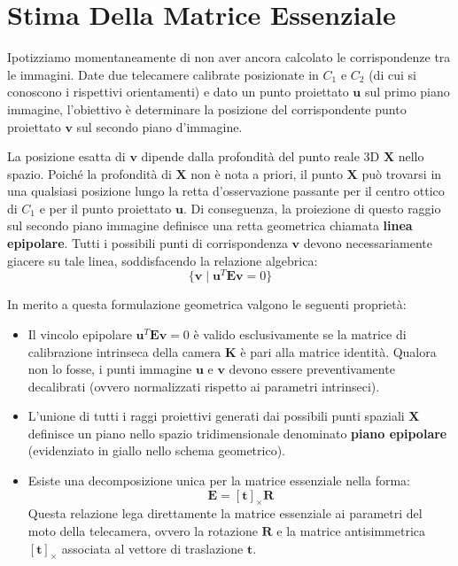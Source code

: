 ﻿\documentclass[11pt, a4paper]{article}
\begin{document}
\newpage

\section{Stima Della Matrice Essenziale}

Ipotizziamo momentaneamente di non aver ancora calcolato le corrispondenze tra le immagini. Date due telecamere calibrate posizionate in $C_1$ e $C_2$ (di cui si conoscono i rispettivi orientamenti) e dato un punto proiettato $\bm{u}$ sul primo piano immagine, l'obiettivo è determinare la posizione del corrispondente punto proiettato $\bm{v}$ sul secondo piano d'immagine.


La posizione esatta di $\bm{v}$ dipende dalla profondità del punto reale 3D $\bm{X}$ nello spazio. Poiché la profondità di $\bm{X}$ non è nota a priori, il punto $\bm{X}$ può trovarsi in una qualsiasi posizione lungo la retta d'osservazione passante per il centro ottico di $C_1$ e per il punto proiettato $\bm{u}$. Di conseguenza, la proiezione di questo raggio sul secondo piano immagine definisce una retta geometrica chiamata \textbf{linea epipolare}. Tutti i possibili punti di corrispondenza $\bm{v}$ devono necessariamente giacere su tale linea, soddisfacendo la relazione algebrica:
\[ \{ \bm{v} \mid \bm{u}^T \bm{E} \bm{v} = 0 \} \]


In merito a questa formulazione geometrica valgono le seguenti proprietà:
\begin{itemize}
    \item Il vincolo epipolare $\bm{u}^T \bm{E} \bm{v} = 0$ è valido esclusivamente se la matrice di calibrazione intrinseca della camera $\bm{K}$ è pari alla matrice identità. Qualora non lo fosse, i punti immagine $\bm{u}$ e $\bm{v}$ devono essere preventivamente decalibrati (ovvero normalizzati rispetto ai parametri intrinseci).
    \item L'unione di tutti i raggi proiettivi generati dai possibili punti spaziali $\bm{X}$ definisce un piano nello spazio tridimensionale denominato \textbf{piano epipolare} (evidenziato in giallo nello schema geometrico).
    \item Esiste una decomposizione unica per la matrice essenziale nella forma:
    \[ \bm{E} = [\bm{t}]_{\times}\bm{R} \]
    Questa relazione lega direttamente la matrice essenziale ai parametri del moto della telecamera, ovvero la rotazione $\bm{R}$ e la matrice antisimmetrica $[\bm{t}]_{\times}$ associata al vettore di traslazione $\bm{t}$.
\end{itemize}
\end{document}
